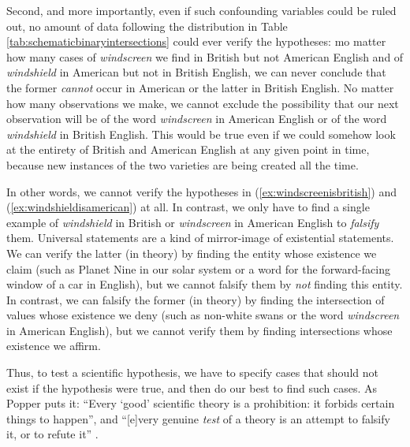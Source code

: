 Second, and more importantly, even if such confounding variables could be ruled out, no amount of data following the distribution in Table \ref{tab:schematicbinaryintersections} could ever verify the hypotheses: mo matter how many cases of \textit{windscreen} we find in British but not American English and of \textit{windshield} in American but not in British English, we can never conclude that the former \textit{cannot} occur in American or the latter in British English. No matter how many observations we make, we cannot exclude the possibility that our next observation will be of the word \textit{windscreen} in American English or of the word \textit{windshield} in British English. This would be true even if we could somehow look at the entirety of British and American English at any given point in time, because new instances of the two varieties are being created all the time.

In other words, we cannot verify the hypotheses in (\ref{ex:windscreenisbritish}) and (\ref{ex:windshieldisamerican}) at all. In contrast, we only have to find a single example of \textit{windshield} in British or \textit{windscreen} in American English to \textit{falsify} them. Universal statements are a kind of mirror-image of existential statements. We can verify the latter (in theory) by finding the entity whose existence we claim (such as Planet Nine in our solar system or a word for the forward-facing window of a car in English), but we cannot falsify them by \emph{not} finding this entity. In contrast, we can falsify the former (in theory) by finding the intersection of values whose existence we deny (such as non-white swans or the word \textit{windscreen} in American English), but we cannot verify them by finding intersections whose existence we affirm.

Thus, to test a scientific hypothesis, we have to specify cases that should not exist if the hypothesis were true, and then do our best to find such cases. As Popper puts it: ``Every `good' scientific theory is a prohibition: it forbids certain things to happen'', and ``[e]very genuine \emph{test} of a theory is an attempt to falsify it, or
to refute it''  \citep[36]{popper_conjectures_1963}.

